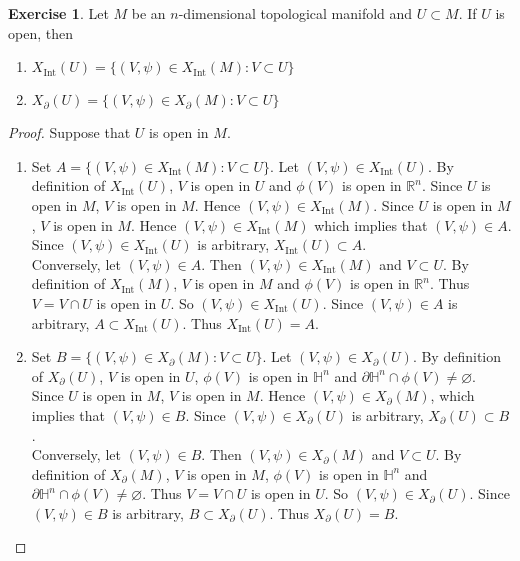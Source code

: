 \documentclass{book}
\theoremstyle{definition}
\newtheorem{ex}[definition]{Exercise}
\renewcommand{\H}{\mathbb{H}}
\newcommand{\R}{\mathbb{R}}
\DeclareMathOperator{\Int}{Int}
\DeclareMathOperator*{\0}{\mbf{0}}
\DeclareMathOperator*{\1}{\mbf{1}}
\newcommand{\p}{\partial}
\begin{document}
	\begin{ex}
		Let $M$ be an $n$-dimensional topological manifold and $U \subset M$. If $U$ is open, then 
		\begin{enumerate}
			\item $X_{\Int}(U) = \{(V, \psi) \in X_{\Int}(M): V \subset U\}$
			\item $X_{\p}(U) = \{(V, \psi) \in X_{\p}(M): V \subset U\}$
		\end{enumerate}
	\end{ex}
	
	\begin{proof}
		Suppose that $U$ is open in $M$.
		\begin{enumerate}
			\item Set $A = \{(V, \psi) \in X_{\Int}(M): V \subset U\}$. Let $(V, \psi) \in X_{\Int}(U)$. By definition of $X_{\Int}(U)$, $V$ is open in $U$ and $\phi(V)$ is open in $\R^n$. Since $U$ is open in $M$, $V$ is open in $M$. Hence $(V, \psi) \in X_{\Int}(M)$. Since $U$ is open in $M$, $V$ is open in $M$. Hence $(V, \psi) \in X_{\Int}(M)$ which implies that $(V, \psi) \in A$. Since $(V, \psi) \in X_{\Int}(U)$ is arbitrary, $X_{\Int}(U) \subset A$. \\
			Conversely, let $(V, \psi) \in A$. Then $(V, \psi) \in X_{\Int}(M)$ and $V \subset U$. By definition of $X_{\Int}(M)$, $V$ is open in $M$ and $\phi(V)$ is open in $\R^n$. Thus $V = V \cap U$ is open in $U$. So $(V, \psi) \in X_{\Int}(U)$. Since $(V, \psi) \in A$ is arbitrary, $A \subset X_{\Int}(U)$. Thus $X_{\Int}(U) = A$.
			
			\item Set $B = \{(V, \psi) \in X_{\p}(M): V \subset U\}$. Let $(V, \psi) \in X_{\p}(U)$. By definition of $X_{\p}(U)$, $V$ is open in $U$, $\phi(V)$ is open in $\H^n$ and $\p \H^n \cap \phi(V) \neq \varnothing$. Since $U$ is open in $M$, $V$ is open in $M$. Hence $(V, \psi) \in X_{\p}(M)$, which implies that $(V, \psi) \in B$. Since $(V, \psi) \in X_{\p}(U)$ is arbitrary, $X_{\p}(U) \subset B$. \\
			Conversely, let $(V, \psi) \in B$. Then $(V, \psi) \in X_{\p}(M)$ and $V \subset U$. By definition of $X_{\p}(M)$, $V$ is open in $M$, $\phi(V)$ is open in $\H^n$ and $\p \H^n \cap \phi(V) \neq \varnothing$. Thus $V = V \cap U$ is open in $U$. So $(V, \psi) \in X_{\p}(U)$. Since $(V, \psi) \in B$ is arbitrary, $B \subset X_{\p}(U)$. Thus $X_{\p}(U) = B$.
		\end{enumerate}
	\end{proof}
	
\end{document}

